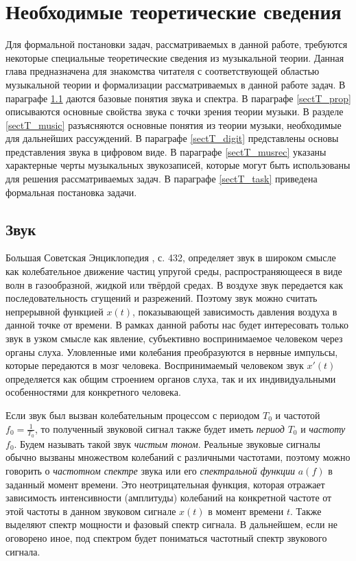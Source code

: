 \chapter{Необходимые теоретические сведения} \label{chaptT}

Для формальной постановки задач, рассматриваемых в данной работе, требуются
некоторые специальные теоретические сведения из музыкальной теории. Данная глава
предназначена для знакомства читателя с соответствующей областью музыкальной
теории и формализации рассматриваемых в данной работе задач. В параграфе
\ref{sectT_sound} даются базовые понятия звука и спектра. В параграфе
\ref{sectT_prop} описываются основные свойства звука с точки зрения теории
музыки. В разделе \ref{sectT_music} разъясняются основные понятия из теории
музыки, необходимые для дальнейших рассуждений. В параграфе \ref{sectT_digit}
представлены основы представления звука в цифровом виде. В параграфе
\ref{sectT_musrec} указаны характерные черты музыкальных звукозаписей, которые
могут быть использованы для решения рассматриваемых задач. В параграфе
\ref{sectT_task} приведена формальная постановка задачи.


\section{Звук} \label{sectT_sound}

Большая Советская Энциклопедия \cite{Bse1972}, с. 432, определяет звук в широком
смысле как колебательное движение частиц упругой среды, распространяющееся в
виде волн в газообразной, жидкой или твёрдой средах. В воздухе звук передается
как последовательность сгущений и разрежений. Поэтому звук можно считать
непрерывной функцией $x(t)$, показывающей зависимость давления воздуха в данной
точке от времени. В рамках данной работы нас будет интересовать только звук в
узком смысле как явление, субъективно воспринимаемое человеком через органы
слуха. Уловленные ими колебания преобразуются в нервные импульсы, которые
передаются в мозг человека. Воспринимаемый человеком звук $x'(t)$ определяется
как общим строением органов слуха, так и их индивидуальными особенностями для
конкретного человека.

Если звук был вызван колебательным процессом с периодом $T_0$ и частотой $f_0 =
\frac{1}{T_0}$, то полученный звуковой сигнал также будет иметь \emph{период}
$T_0$ и \emph{частоту} $f_0$. Будем называть такой звук \emph{чистым тоном}.
Реальные звуковые сигналы обычно вызваны множеством колебаний с различными
частотами, поэтому можно говорить о \emph{частотном спектре} звука или его
\emph{спектральной функции} $a(f)$ в заданный момент времени. Это
неотрицательная функция, которая отражает зависимость интенсивности (амплитуды)
колебаний на конкретной частоте от этой частоты в данном звуковом сигнале $x(t)$
в момент времени $t$. Также выделяют спектр мощности и фазовый спектр сигнала. В
дальнейшем, если не оговорено иное, под спектром будет пониматься частотный
спектр звукового сигнала.

